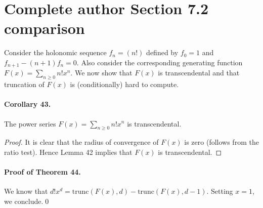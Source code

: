 \section*{Complete author Section 7.2 comparison}
Consider the holonomic sequence $f_n=(n!)$ defined by $f_0=1$ and $f_{n+1}-(n+1)f_n=0$. Also consider the corresponding generating function $F(x)=\sum_{n\ge0}n!x^n$. We now show that $F(x)$ is transcendental and that truncation of $F(x)$ is (conditionally) hard to compute.
\paragraph{Corollary 43.} The power series $F(x)=\sum_{n\ge0}n!x^n$ is transcendental.
\begin{proof}It is clear that the radius of convergence of $F(x)$ is zero (follows from the ratio test). Hence Lemma 42 implies that $F(x)$ is transcendental.\end{proof}
\paragraph{Proof of Theorem 44.} We know that $d!x^d=\mathrm{trunc}(F(x),d)-\mathrm{trunc}(F(x),d-1)$. Setting $x=1$, we conclude.\qed
